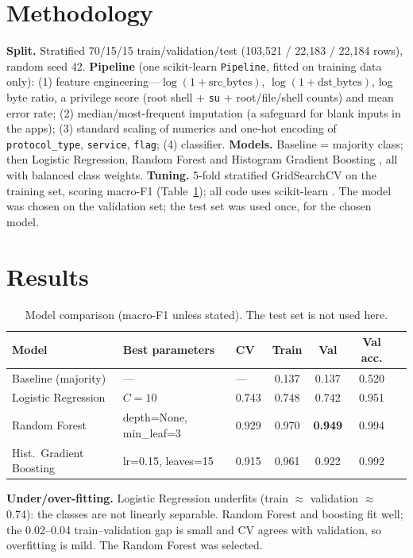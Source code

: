 \documentclass[10pt,a4paper]{article}
\begin{document}
\section{Methodology}
\textbf{Split.} Stratified 70/15/15 train/validation/test (103{,}521 / 22{,}183 / 22{,}184 rows), random seed 42.
\textbf{Pipeline} (one scikit-learn \texttt{Pipeline}, fitted on training data only): (1) feature engineering---$\log(1{+}\text{src\_bytes})$,
$\log(1{+}\text{dst\_bytes})$, log byte ratio, a privilege score (root shell + \texttt{su} + root/file/shell counts) and mean error rate;
(2) median/most-frequent imputation (a safeguard for blank inputs in the apps); (3) standard scaling of numerics and one-hot encoding of
\texttt{protocol\_type}, \texttt{service}, \texttt{flag}; (4) classifier.
\textbf{Models.} Baseline = majority class; then Logistic Regression, Random Forest \cite{breiman2001} and Histogram Gradient Boosting
\cite{friedman2001}, all with balanced class weights. \textbf{Tuning.} 5-fold stratified GridSearchCV on the training set,
scoring macro-F1 (Table~\ref{tab:cmp}); all code uses scikit-learn \cite{pedregosa2011}. The model was chosen on the validation set; the test set was used once, for the chosen model.

\section{Results}
\begin{table}[H]\centering\small
\caption{Model comparison (macro-F1 unless stated). The test set is not used here.}\label{tab:cmp}
\begin{tabular}{lllcccc}\toprule
Model & Best parameters & CV & Train & Val & Val acc.\\\midrule
Baseline (majority) & --- & --- & 0.137 & 0.137 & 0.520\\
Logistic Regression & $C=10$ & 0.743 & 0.748 & 0.742 & 0.951\\
Random Forest & depth=None, min\_leaf=3 & 0.929 & 0.970 & \textbf{0.949} & 0.994\\
Hist.\ Gradient Boosting & lr=0.15, leaves=15 & 0.915 & 0.961 & 0.922 & 0.992\\\bottomrule
\end{tabular}
\end{table}
\textbf{Under/over-fitting.} Logistic Regression underfits (train $\approx$ validation $\approx$ 0.74): the classes are not linearly separable.
Random Forest and boosting fit well; the 0.02--0.04 train--validation gap is small and CV agrees with validation, so overfitting is mild.
The Random Forest was selected.
\end{document}
